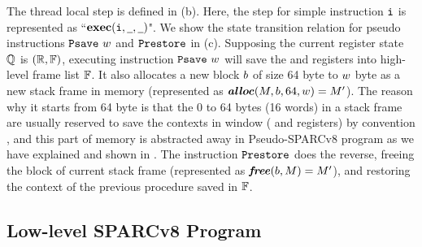 The thread local step is defined in  
\Fig{\ref{fig:selected-opsem-high-level-prog}} (b). 
Here, the step for simple instruction $\texttt{i}{}$ is 
represented as ``$\textbf{exec}({\texttt{i}{}}, {\underline{\ \,}}, {\underline{\ \,}})$". 
We show the state transition relation for pseudo instructions 
$\texttt{Psave} \ w$ and $\texttt{Prestore}$ in 
\Fig{\ref{fig:selected-opsem-high-level-prog}} (c). 
Supposing the current register state $\mathbb{Q}$ is 
$(\mathbb{R}, \mathbb{F})$, executing instruction
$\texttt{Psave} \ w$ will save the \localRN{} and \inRN{} registers 
into high-level frame list $\mathbb{F}$. It also allocates 
a new block $b$ of size 64 byte to $w$ byte  
as a new stack frame in memory 
(represented as $\textbf{\textit{alloc}}(M, b, 64, w) = M'$). 
The reason why it starts from 64 byte is that the 0 to 64 bytes 
(16 words) in a stack frame are usually reserved to save 
the contexts in window (\localRN{} and \inRN{} registers)
by convention \cite{sparc},   
and this part of memory is abstracted away in 
Pseudo-SPARCv8 program as we have explained and shown in 
\Fig{\ref{fig:Abstraction of Register Windows and Memory}}.
The instruction $\texttt{Prestore}$ does the reverse, 
freeing the block of current stack frame
(represented as $\textbf{\textit{free}}(b, M) = M'$), and 
restoring the context of the previous procedure 
saved in $\mathbb{F}$. 

\subsection{Low-level SPARCv8 Program}
\label{subsec:low-level SPARCv8 Program}



